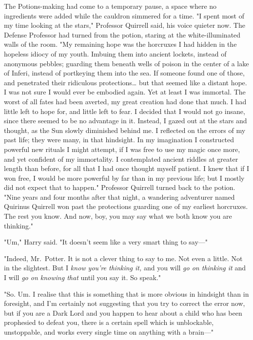 The Potions-making had come to a temporary pause, a space where no ingredients
were added while the cauldron simmered for a time. "I spent most of my time
looking at the stars," Professor Quirrell said, his voice quieter now. The
Defense Professor had turned from the potion, staring at the white-illuminated
walls of the room. "My remaining hope was the horcruxes I had hidden in the
hopeless idiocy of my youth. Imbuing them into ancient lockets, instead of
anonymous pebbles; guarding them beneath wells of poison in the center of a
lake of Inferi, instead of portkeying them into the sea. If someone found one
of those, and penetrated their ridiculous protections{\ldots} but that seemed
like a distant hope. I was not sure I would ever be embodied again. Yet at
least I was immortal. The worst of all fates had been averted, my great
creation had done that much. I had little left to hope for, and little left to
fear. I decided that I would not go insane, since there seemed to be no
advantage in it. Instead, I gazed out at the stars and thought, as the Sun
slowly diminished behind me. I reflected on the errors of my past life; they
were many, in that hindsight. In my imagination I constructed powerful new
rituals I might attempt, if I was free to use my magic once more, and yet
confident of my immortality. I contemplated ancient riddles at greater length
than before, for all that I had once thought myself patient. I knew that if I
won free, I would be more powerful by far than in my previous life; but I
mostly did not expect that to happen." Professor Quirrell turned back to the
potion. "Nine years and four months after that night, a wandering adventurer
named Quirinus Quirrell won past the protections guarding one of my earliest
horcruxes. The rest you know. And now, boy, you may say what we both know you
are thinking."

"Um," Harry said. "It doesn't seem like a very smart thing to say---"

"Indeed, Mr.~Potter. It is not a clever thing to say to me. Not even a little.
Not in the slightest. But I \emph{know you're thinking it,} and you will
\emph{go on thinking it} and I will \emph{go on knowing that} until you say it.
So speak."

"So. Um. I realise that this is something that is more obvious in hindsight
than in foresight, and I'm certainly not suggesting that you try to correct the
error now, but if you are a Dark Lord and you happen to hear about a child who
has been prophesied to defeat you, there is a certain spell which is
unblockable, unstoppable, and works every single time on anything with a
brain---"

